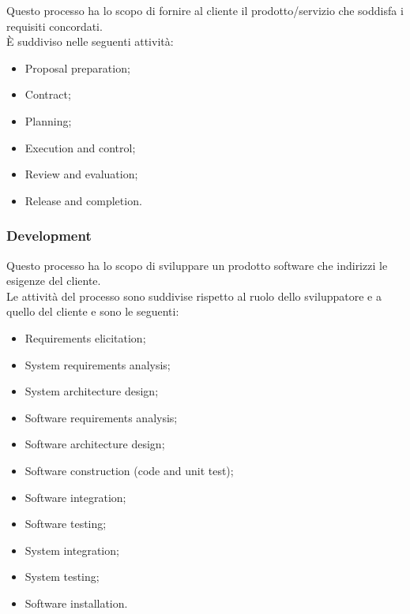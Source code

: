 Questo processo ha lo scopo di fornire al cliente il prodotto/servizio che soddisfa i requisiti concordati.\\

È suddiviso nelle seguenti attività:

\begin{itemize}

  \item Proposal preparation;

  \item Contract;

  \item Planning;

  \item Execution and control;

  \item Review and evaluation;

  \item Release and completion.

\end{itemize}


\subsubsection{Development}

Questo processo ha lo scopo di sviluppare un prodotto software che indirizzi le esigenze del cliente.\\

Le attività del processo sono suddivise rispetto al ruolo dello sviluppatore e a quello del cliente e sono le seguenti:

\begin{itemize}

  \item Requirements elicitation;

  \item System requirements analysis;

  \item System architecture design;

  \item Software requirements analysis;

  \item Software architecture design;

  \item Software construction (code and unit test);

  \item Software integration;

  \item Software testing;

  \item System integration;

  \item System testing;

  \item Software installation.

\end{itemize}


